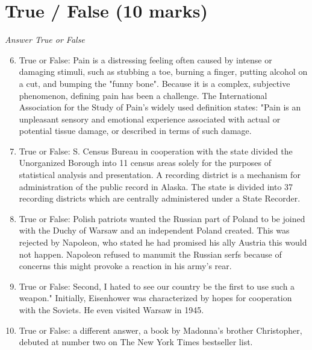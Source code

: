 \documentclass[12pt]{article}
\begin{document}
\section*{True / False (10 marks)}
\textit{Answer True or False}
\begin{enumerate}[label=\arabic*.]
\setcounter{enumi}{5}
\item True or False: Pain is a distressing feeling often caused by intense or damaging stimuli, such as stubbing a toe, burning a finger, putting alcohol on a cut, and bumping the "funny bone". Because it is a complex, subjective phenomenon, defining pain has been a challenge. The International Association for the Study of Pain's widely used definition states: "Pain is an unpleasant sensory and emotional experience associated with actual or potential tissue damage, or described in terms of such damage.
\item True or False: S. Census Bureau in cooperation with the state divided the Unorganized Borough into 11 census areas solely for the purposes of statistical analysis and presentation. A recording district is a mechanism for administration of the public record in Alaska. The state is divided into 37 recording districts which are centrally administered under a State Recorder.
\item True or False: Polish patriots wanted the Russian part of Poland to be joined with the Duchy of Warsaw and an independent Poland created. This was rejected by Napoleon, who stated he had promised his ally Austria this would not happen. Napoleon refused to manumit the Russian serfs because of concerns this might provoke a reaction in his army's rear.
\item True or False: Second, I hated to see our country be the first to use such a weapon." Initially, Eisenhower was characterized by hopes for cooperation with the Soviets. He even visited Warsaw in 1945.
\item True or False: a different answer, a book by Madonna's brother Christopher, debuted at number two on The New York Times bestseller list.
\end{enumerate}
\end{document}
